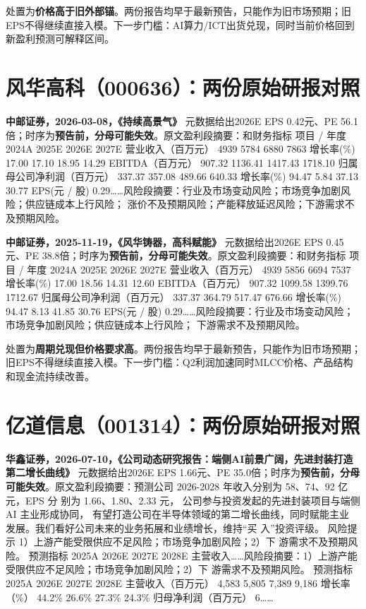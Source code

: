 \begin{keyinsight}[AStock处理]
处置为\textbf{价格高于旧外部锚}。两份报告均早于最新预告，只能作为旧市场预期；旧EPS不得继续直接入模。下一步门槛：AI算力/ICT出货兑现，同时当前价格回到新盈利预测可解释区间。
\end{keyinsight}

\section{风华高科（000636）：两份原始研报对照}

\textbf{中邮证券，2026-03-08，《持续高景气》}
元数据给出2026E EPS 0.42元、PE 56.1倍；时序为\textbf{预告前，分母可能失效}。原文盈利段摘要：和财务指标 项目 / 年度 2024A 2025E 2026E 2027E 营业收入（百万元） 4939 5784 6880 7863 增长率(\%) 17.00 17.10 18.95 14.29 EBITDA（百万元） 907.32 1136.41 1417.43 1718.10 归属母公司净利润（百万元） 337.37 357.08 489.66 640.33 增长率(\%) 94.47 5.84 37.13 30.77 EPS(元 / 股) 0.29……风险段摘要：行业及市场变动风险；市场竞争加剧风险；供应链成本上行风险； 涨价不及预期风险；产能释放延迟风险；下游需求不及预期风险。

\textbf{中邮证券，2025-11-19，《风华铸器，高科赋能》}
元数据给出2026E EPS 0.45元、PE 38.8倍；时序为\textbf{预告前，分母可能失效}。原文盈利段摘要：和财务指标 项目 / 年度 2024A 2025E 2026E 2027E 营业收入（百万元） 4939 5856 6694 7537 增长率(\%) 17.00 18.56 14.31 12.60 EBITDA（百万元） 907.32 1099.58 1399.76 1712.67 归属母公司净利润（百万元） 337.37 364.79 517.47 676.66 增长率(\%) 94.47 8.13 41.85 30.76 EPS(元 / 股) 0.29……风险段摘要：行业及市场变动风险；市场竞争加剧风险；供应链成本上行风险； 下游需求不及预期风险。

\begin{keyinsight}[AStock处理]
处置为\textbf{周期兑现但价格要求高}。两份报告均早于最新预告，只能作为旧市场预期；旧EPS不得继续直接入模。下一步门槛：Q2利润加速同时MLCC价格、产品结构和现金流持续改善。
\end{keyinsight}

\section{亿道信息（001314）：两份原始研报对照}

\textbf{华鑫证券，2026-07-10，《公司动态研究报告：端侧AI前景广阔，先进封装打造第二增长曲线》}
元数据给出2026E EPS 1.66元、PE 35.0倍；时序为\textbf{预告前，分母可能失效}。原文盈利段摘要：预测公司 2026-2028 年收入分别为 58、74、92 亿元，EPS 分 别为 1.66、1.80、2.33 元， 公司参与投资发起的先进封装项目与端侧 AI 主业形成协同， 有望打造公司在半导体领域的第二增长曲线，同时赋能主业 发展。我们看好公司未来的业务拓展和业绩增长，维持“买 入”投资评级。 风险提示 1）上游产能受限供应不足风险；市场竞争加剧风险；2）下 游需求不及预期风险。 预测指标 2025A 2026E 2027E 2028E 主营收入……风险段摘要：1）上游产能受限供应不足风险；市场竞争加剧风险；2）下 游需求不及预期风险。 预测指标 2025A 2026E 2027E 2028E 主营收入（百万元） 4,583 5,805 7,389 9,186 增长率（\%） 44.2\% 26.6\% 27.3\% 24.3\% 归母净利润（百万元） 6……

